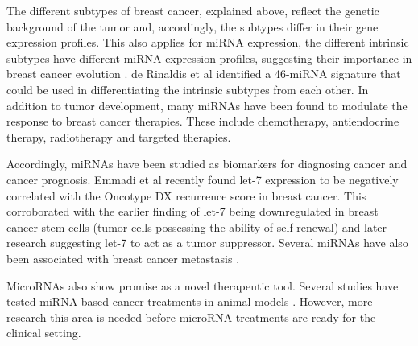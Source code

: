 The different subtypes of breast cancer, explained above, reflect the genetic
background of the tumor and, accordingly, the subtypes differ in their gene
expression profiles. This also applies for miRNA expression, the different
intrinsic subtypes have different miRNA expression profiles, suggesting their
importance in breast cancer evolution \citep{Blenkiron2007}.
de Rinaldis et al \citep{deRinaldis2013}
identified a 46-miRNA signature that could be used in differentiating the
intrinsic subtypes from each other. In addition to
tumor development, many miRNAs have been found to modulate the response to
breast cancer therapies. These include chemotherapy, antiendocrine therapy,
radiotherapy and targeted therapies.

Accordingly, miRNAs have been studied as biomarkers for diagnosing cancer and
cancer prognosis. Emmadi et al \citep{Emmadi2015} recently found let-7 expression to be negatively
correlated with the Oncotype DX recurrence score in breast cancer.
This corroborated with the earlier finding of let-7 being
downregulated in breast cancer stem cells (tumor cells possessing the ability
of self-renewal) \citep{Yu2007} and later research suggesting let-7 to act as
a tumor suppressor. Several miRNAs have also been associated with breast cancer
metastasis \citep{Chen2016}.

MicroRNAs also show promise as a novel therapeutic tool. Several studies have
tested miRNA-based cancer treatments in animal models \citep{VanRooij2014}.
However, more research this area is needed before microRNA treatments are
ready for the clinical setting.


